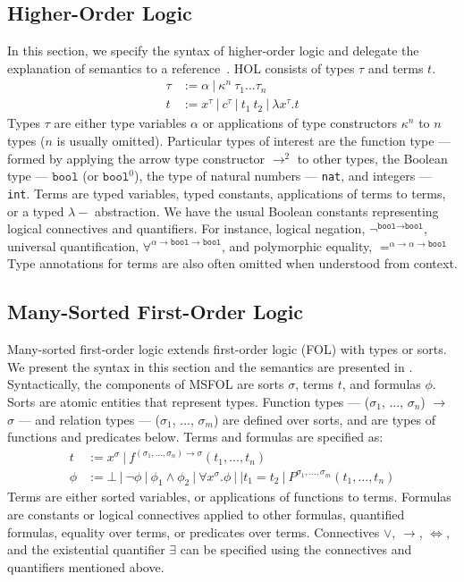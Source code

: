 \documentclass{article}
\begin{document}
	\subsection{Higher-Order Logic}
	\label{sec:hol}
	In this section, we specify the 
	syntax of higher-order logic 
	and delegate the explanation of 
	semantics to a 
	reference~\cite{10.5555/155278}. 
	HOL consists of 
	types $\tau$ and terms $t$. 
	\begin{align*}
	\tau &:= \alpha\ |\ \kappa^n\ 
	\tau_1 ... \tau_n\\
	t &:= x^{\tau}\ |\ c^{\tau}\ |\ t_1\ t_2\ 
	|\ \lambda x^{\tau}.t
	\end{align*}	
	Types $\tau$ are either type
	variables $\alpha$ or 
	applications of type 
	constructors $\kappa^n$ to 
	$n$ types ($n$ is usually omitted). 
	Particular types of interest are 
	the function type --- formed by 
	applying the arrow type constructor 
	$\to^{2}$ to other types, the 
	Boolean type --- $\texttt{bool}$ 
	(or $\texttt{bool}^0$), the type of 
	natural numbers --- \texttt{nat},
	and integers --- \texttt{int}.
	Terms are typed variables, 
	typed constants, applications 
	of terms to terms, or a typed
	$\lambda-$ abstraction. We have
	the usual Boolean constants 
	representing logical connectives
	and quantifiers. For instance, 
	logical negation, 
	$\neg^{\texttt{bool} \to 
	\texttt{bool}}$, universal 
	quantification,
	$\forall^{\alpha \to 
	\texttt{bool} \to \texttt{bool}}$, 
	and polymorphic equality,
	$=^{\alpha \to \alpha 
	\to \texttt{bool}}$ Type 
	annotations for terms are also 
	often omitted when understood
	from context.

	\subsection{Many-Sorted First-Order Logic}
	\label{sec:msfol}
	Many-sorted first-order logic extends
	first-order logic (FOL) with 
	types or sorts. We present the 
	syntax in this section and the 
	semantics are presented in
	\cite{Barrett2018}. Syntactically, 
	the components of MSFOL are sorts 
	$\sigma$, terms $t$, and 
	formulas $\phi$. Sorts are 
	atomic entities that 
	represent types. Function types 
	--- ($\sigma_1$, ..., $\sigma_n$) 
	$\to$ $\sigma$ ---
	and relation types 
	--- ($\sigma_1$, ..., $\sigma_m$)
	are defined over sorts, and 
	are types of functions and 
	predicates below. Terms and 
	formulas are specified as:
	\begin{align*}
		t &:= x^{\sigma}\ |\ 
		f^{(\sigma_1, ..., \sigma_n) \to 
		\sigma}	(t_1, ..., t_n)\\
		\phi &:= \bot\ |\ \neg \phi\ |\ 
		\phi_1 \land \phi_2\ |\ \forall 
		x^{\sigma} . \phi\ |\ | t_1 = t_2
		\ |\ P^{\sigma_1,...,\sigma_m}
		(t_1, ..., t_n)
	\end{align*}
	Terms are either sorted variables, 
	or applications of functions to terms.
	Formulas are constants or logical 
	connectives applied to other 
	formulas, quantified formulas, 
	equality over terms, or predicates 
	over terms. Connectives $\lor$, 
	$\to$, $\iff$, and the existential
	quantifier $\exists$ can be 
	specified using the connectives 
	and quantifiers mentioned above.
	
\end{document}
